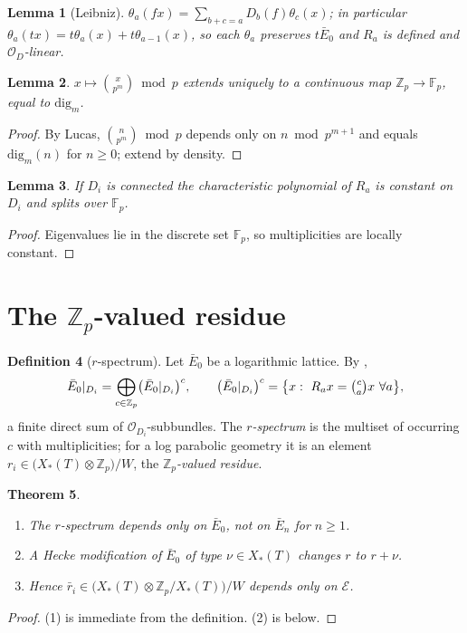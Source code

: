 \documentclass[11pt,reqno]{amsart}
\newcommand{\Zp}{\mathbb{Z}_p}
\newcommand{\Fp}{\mathbb{F}_p}
\newcommand{\cO}{\mathcal{O}}
\newcommand{\cE}{\mathcal{E}}
\newcommand{\dig}{\mathrm{dig}}
\newcommand{\Xst}{X_*(T)}
\theoremstyle{plain}
\newtheorem{theorem}{Theorem}[section]
\newtheorem{lemma}[theorem]{Lemma}
\theoremstyle{definition}
\newtheorem{definition}[theorem]{Definition}
\theoremstyle{remark}
\numberwithin{equation}{section}
\begin{document}
\begin{lemma}[Leibniz]\label{lem:leibniz}
$\theta_a(fx)=\sum_{b+c=a}D_b(f)\theta_c(x)$; in particular
$\theta_a(tx)=t\theta_a(x)+t\theta_{a-1}(x)$, so each $\theta_a$ preserves
$t\bar E_0$ and $R_a$ is defined and $\cO_D$-linear.
\end{lemma}

\begin{lemma}\label{lem:digitmap}
$x\mapsto\binom{x}{p^m}\bmod p$ extends uniquely to a continuous map
$\Zp\to\Fp$, equal to $\dig_m$.
\end{lemma}
\begin{proof}
By Lucas, $\binom{n}{p^m}\bmod p$ depends only on $n\bmod p^{m+1}$ and
equals $\dig_m(n)$ for $n\ge0$; extend by density.
\end{proof}

\begin{lemma}\label{lem:constant}
If $D_i$ is connected the characteristic polynomial of $R_a$ is constant
on $D_i$ and splits over $\Fp$.
\end{lemma}
\begin{proof}
Eigenvalues lie in the discrete set $\Fp$, so multiplicities are locally
constant.
\end{proof}

\section{The $\Zp$-valued residue}\label{sec:residue}

\begin{definition}[$r$-spectrum]\label{def:rspec}
Let $\bar E_0$ be a logarithmic lattice.  By ,
\[
   \bar E_0|_{D_i}=\bigoplus_{c\in\Zp}\bigl(\bar E_0|_{D_i}\bigr)^c,
   \qquad
   \bigl(\bar E_0|_{D_i}\bigr)^c=\bigl\{x:\ R_ax=\tbinom ca x\ \forall a\bigr\},
\]
a finite direct sum of $\cO_{D_i}$-subbundles.  The \emph{$r$-spectrum}
is the multiset of occurring $c$ with multiplicities; for a log parabolic
geometry it is an element
$r_i\in\bigl(\Xst\otimes\Zp\bigr)/W$, the \emph{$\Zp$-valued residue}.
\end{definition}

\begin{theorem}\label{thm:welldef}
\begin{enumerate}
\item The $r$-spectrum depends only on $\bar E_0$, not on
      $\bar E_n$ for $n\ge1$.
\item A Hecke modification of $\bar E_0$ of type $\nu\in\Xst$ changes $r$
      to $r+\nu$.
\item Hence $\bar r_i\in\bigl(\Xst\otimes\Zp/\Xst\bigr)/W$ depends only on
      $\cE$.
\end{enumerate}
\end{theorem}
\begin{proof}
(1) is immediate from the definition.  (2) is  below.
\end{proof}
\end{document}
